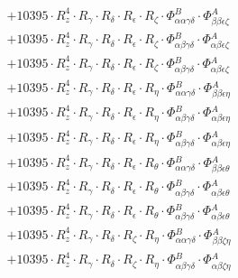 \documentclass{article}
\begin{document}
\begin{subequations}
\begin{gather}
\begin{array}{c}
 \\[0.2em] 		 + 10395 \cdot R_{z}^{4} \cdot R_{\gamma{}} \cdot R_{\delta{}} \cdot R_{\epsilon{}} \cdot R_{\zeta{}} \cdot \Phi{}^{B}_{\alpha{}\alpha{}\gamma{}\delta{}} \cdot \Phi{}^{A}_{\beta{}\beta{}\epsilon{}\zeta{}} 
 \\[0.2em] 		 + 10395 \cdot R_{z}^{4} \cdot R_{\gamma{}} \cdot R_{\delta{}} \cdot R_{\epsilon{}} \cdot R_{\zeta{}} \cdot \Phi{}^{B}_{\alpha{}\beta{}\gamma{}\delta{}} \cdot \Phi{}^{A}_{\alpha{}\beta{}\epsilon{}\zeta{}} 
 \\[0.2em] 		 + 10395 \cdot R_{z}^{4} \cdot R_{\gamma{}} \cdot R_{\delta{}} \cdot R_{\epsilon{}} \cdot R_{\zeta{}} \cdot \Phi{}^{B}_{\alpha{}\beta{}\gamma{}\delta{}} \cdot \Phi{}^{A}_{\alpha{}\beta{}\epsilon{}\zeta{}} 
 \\[0.2em] 		 + 10395 \cdot R_{z}^{4} \cdot R_{\gamma{}} \cdot R_{\delta{}} \cdot R_{\epsilon{}} \cdot R_{\eta{}} \cdot \Phi{}^{B}_{\alpha{}\alpha{}\gamma{}\delta{}} \cdot \Phi{}^{A}_{\beta{}\beta{}\epsilon{}\eta{}} 
 \\[0.2em] 		 + 10395 \cdot R_{z}^{4} \cdot R_{\gamma{}} \cdot R_{\delta{}} \cdot R_{\epsilon{}} \cdot R_{\eta{}} \cdot \Phi{}^{B}_{\alpha{}\beta{}\gamma{}\delta{}} \cdot \Phi{}^{A}_{\alpha{}\beta{}\epsilon{}\eta{}} 
 \\[0.2em] 		 + 10395 \cdot R_{z}^{4} \cdot R_{\gamma{}} \cdot R_{\delta{}} \cdot R_{\epsilon{}} \cdot R_{\eta{}} \cdot \Phi{}^{B}_{\alpha{}\beta{}\gamma{}\delta{}} \cdot \Phi{}^{A}_{\alpha{}\beta{}\epsilon{}\eta{}} 
 \\[0.2em] 		 + 10395 \cdot R_{z}^{4} \cdot R_{\gamma{}} \cdot R_{\delta{}} \cdot R_{\epsilon{}} \cdot R_{\theta{}} \cdot \Phi{}^{B}_{\alpha{}\alpha{}\gamma{}\delta{}} \cdot \Phi{}^{A}_{\beta{}\beta{}\epsilon{}\theta{}} 
 \\[0.2em] 		 + 10395 \cdot R_{z}^{4} \cdot R_{\gamma{}} \cdot R_{\delta{}} \cdot R_{\epsilon{}} \cdot R_{\theta{}} \cdot \Phi{}^{B}_{\alpha{}\beta{}\gamma{}\delta{}} \cdot \Phi{}^{A}_{\alpha{}\beta{}\epsilon{}\theta{}} 
 \\[0.2em] 		 + 10395 \cdot R_{z}^{4} \cdot R_{\gamma{}} \cdot R_{\delta{}} \cdot R_{\epsilon{}} \cdot R_{\theta{}} \cdot \Phi{}^{B}_{\alpha{}\beta{}\gamma{}\delta{}} \cdot \Phi{}^{A}_{\alpha{}\beta{}\epsilon{}\theta{}} 
 \\[0.2em] 		 + 10395 \cdot R_{z}^{4} \cdot R_{\gamma{}} \cdot R_{\delta{}} \cdot R_{\zeta{}} \cdot R_{\eta{}} \cdot \Phi{}^{B}_{\alpha{}\alpha{}\gamma{}\delta{}} \cdot \Phi{}^{A}_{\beta{}\beta{}\zeta{}\eta{}} 
 \\[0.2em] 		 + 10395 \cdot R_{z}^{4} \cdot R_{\gamma{}} \cdot R_{\delta{}} \cdot R_{\zeta{}} \cdot R_{\eta{}} \cdot \Phi{}^{B}_{\alpha{}\beta{}\gamma{}\delta{}} \cdot \Phi{}^{A}_{\alpha{}\beta{}\zeta{}\eta{}} 

\end{array}
\end{gather}
\end{subequations}
\end{document}
